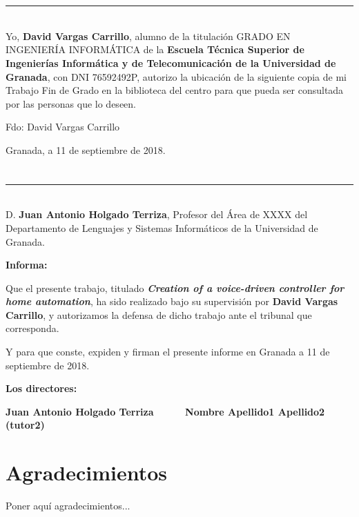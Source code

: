 \chapter*{}
\thispagestyle{empty}

\noindent\rule[-1ex]{\textwidth}{2pt}\\[4.5ex]

Yo, \textbf{David Vargas Carrillo}, alumno de la titulación GRADO EN INGENIERÍA INFORMÁTICA de la \textbf{Escuela 
Técnica Superior de Ingenierías Informática y de Telecomunicación de la Universidad de Granada}, con DNI 76592492P, 
autorizo la ubicación de la siguiente copia de mi Trabajo Fin de Grado en la biblioteca del centro para que pueda ser
consultada por las personas que lo deseen.

\vspace{6cm}

\noindent Fdo: David Vargas Carrillo

\vspace{2cm}

\begin{flushright}
Granada, a 11 de septiembre de 2018.
\end{flushright}


\chapter*{}
\thispagestyle{empty}

\noindent\rule[-1ex]{\textwidth}{2pt}\\[4.5ex]

D. \textbf{Juan Antonio Holgado Terriza}, Profesor del Área de XXXX del Departamento de Lenguajes y Sistemas Informáticos de la Universidad de Granada.

\vspace{0.5cm}

\textbf{Informa:}

\vspace{0.5cm}

Que el presente trabajo, titulado \textit{\textbf{Creation of a voice-driven controller for home automation}},
ha sido realizado bajo su supervisión por \textbf{David Vargas Carrillo}, y autorizamos la defensa de dicho trabajo 
ante el tribunal que corresponda.

\vspace{0.5cm}

Y para que conste, expiden y firman el presente informe en Granada a 11 de septiembre de 2018.

\vspace{1cm}

\textbf{Los directores:}

\vspace{5cm}

\noindent \textbf{Juan Antonio Holgado Terriza \ \ \ \ \ Nombre Apellido1 Apellido2 (tutor2)}

\chapter*{Agradecimientos}
\thispagestyle{empty}

       \vspace{1cm}


Poner aquí agradecimientos...

